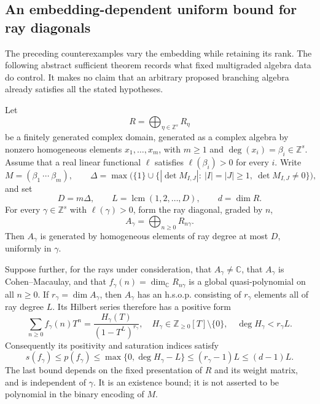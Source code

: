 \subsection{An embedding-dependent uniform bound for ray diagonals}

The preceding counterexamples vary the embedding while retaining its rank.
The following abstract sufficient theorem records what fixed multigraded
algebra data do control. It makes no claim that an arbitrary proposed
branching algebra already satisfies all the stated hypotheses.

\begin{proposition}
\label{prop:fixedmultigrading}
Let
\[
 R=\bigoplus_{\eta\in\mathbb Z^s}R_\eta
\]
be a finitely generated complex domain, generated as a complex algebra by
nonzero homogeneous elements $x_1,\ldots,x_m$, with $m\ge1$ and
$\deg(x_i)=\beta_i\in\mathbb Z^s$.
Assume that a real linear functional $\ell$ satisfies
$\ell(\beta_i)>0$ for every $i$. Write
\[
 M=(\beta_1\ \cdots\ \beta_m),\qquad
 \Delta=\max\bigl(\{1\}\cup
 \{|\det M_{I,J}|:\ |I|=|J|\ge1,\ \det M_{I,J}\ne0\}\bigr),
\]
and set
\[
 D=m\Delta,\qquad L=\operatorname{lcm}(1,2,\ldots,D),
 \qquad d=\dim R.
 \tag{P-F16a}
\]
For every $\gamma\in\mathbb Z^s$ with $\ell(\gamma)>0$, form the ray
diagonal, graded by $n$,
\[
 A_\gamma=\bigoplus_{n\ge0} R_{n\gamma}.
\]
Then $A_\gamma$ is generated by homogeneous elements of ray degree at
most $D$, uniformly in $\gamma$.

Suppose further, for the rays under consideration, that $A_\gamma\ne\mathbb C$,
that $A_\gamma$ is Cohen--Macaulay, and that
$f_\gamma(n)=\dim_\mathbb C R_{n\gamma}$ is a global quasi-polynomial
on all $n\ge0$. If $r_\gamma=\dim A_\gamma$, then $A_\gamma$ has an
h.s.o.p. consisting of $r_\gamma$ elements all of ray degree $L$.
Its Hilbert series therefore has a positive form
\[
 \sum_{n\ge0}f_\gamma(n)T^n
 =\frac{H_\gamma(T)}{(1-T^L)^{r_\gamma}},
 \quad H_\gamma\in\mathbb Z_{\ge0}[T]\setminus\{0\},
 \quad \deg H_\gamma<r_\gamma L.
 \tag{P-F16b}
\]
Consequently its positivity and saturation indices satisfy
\[
 s(f_\gamma)\le p(f_\gamma)
 \le\max\{0,\deg H_\gamma-L\}
 \le(r_\gamma-1)L\le(d-1)L.
 \tag{P-F16c}
\]
The last bound depends on the fixed presentation of $R$ and its weight
matrix, and is independent of $\gamma$. It is an existence bound;
it is not asserted to be polynomial in the binary encoding of $M$.
\end{proposition}

